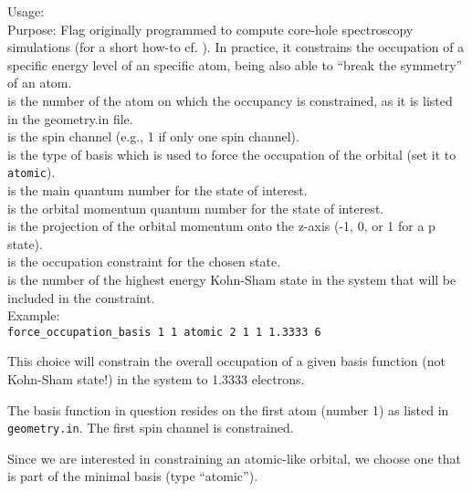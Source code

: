 {
  \noindent
  Usage:       
     \\[1.0ex]
  Purpose: Flag originally programmed to compute core-hole spectroscopy simulations (for a short how-to cf. ). 
           In practice, it constrains the occupation of a specific
           energy level of an specific atom, being also able to ``break the symmetry'' 
           of an atom.  \\[1.0ex]
   is the number of the atom on which the occupancy is constrained, as it is listed in the
                   geometry.in file.\\[1.0ex] 
   is the spin channel (e.g., 1 if only one spin channel). \\[1.0ex] 
   is the type of basis which is used to force
                       the occupation of the orbital (set it to \texttt{atomic}). \\[1.0ex]
   is the main quantum number for
                    the state of interest.\\[1.0ex]
   is the orbital momentum quantum number for the state of interest.\\[1.0ex]
   is the projection of the orbital momentum onto the z-axis (-1, 0, or 1 for a p state).\\[1.0ex]
   is the occupation constraint for the chosen state.\\[1.0ex]
   is the number of the highest energy Kohn-Sham state 
                    in the system that will be included in the constraint.\\[1.0ex]  
}
  Example: \\[1.0ex]
  \texttt{force\_occupation\_basis 1 1 atomic 2 1 1 1.3333 6}

  This choice will constrain the overall occupation of a given basis function 
  (not Kohn-Sham state!) in the system to 1.3333 electrons.

  The basis function in question resides on the first atom (number 1)
  as listed in \texttt{geometry.in}. The first spin channel is
  constrained. 

  Since we are interested in constraining an atomic-like orbital, we
  choose one that is part of the minimal basis (type ``atomic''). 

